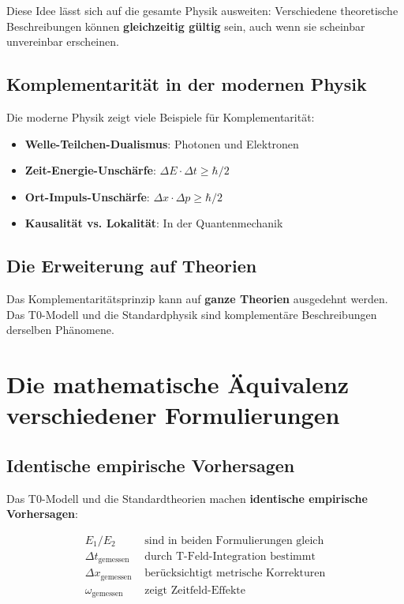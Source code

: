 \documentclass[12pt,a4paper]{report}
\begin{document}
	Diese Idee lässt sich auf die gesamte Physik ausweiten: Verschiedene theoretische Beschreibungen können \textbf{gleichzeitig gültig} sein, auch wenn sie scheinbar unvereinbar erscheinen.
	
	\subsection{Komplementarität in der modernen Physik}
	
	Die moderne Physik zeigt viele Beispiele für Komplementarität:
	
	\begin{itemize}
		\item \textbf{Welle-Teilchen-Dualismus}: Photonen und Elektronen
		\item \textbf{Zeit-Energie-Unschärfe}: $\Delta E \cdot \Delta t \geq \hbar/2$
		\item \textbf{Ort-Impuls-Unschärfe}: $\Delta x \cdot \Delta p \geq \hbar/2$
		\item \textbf{Kausalität vs. Lokalität}: In der Quantenmechanik
	\end{itemize}
	
	\subsection{Die Erweiterung auf Theorien}
	
	Das Komplementaritätsprinzip kann auf \textbf{ganze Theorien} ausgedehnt werden. Das T0-Modell und die Standardphysik sind komplementäre Beschreibungen derselben Phänomene.
	
	\section{Die mathematische Äquivalenz verschiedener Formulierungen}
	
	\subsection{Identische empirische Vorhersagen}
	
	Das T0-Modell und die Standardtheorien machen \textbf{identische empirische Vorhersagen}:
	
	\begin{align}
		E_{1}/E_{2} &\text{ sind in beiden Formulierungen gleich} \\
		\Delta t_{\text{gemessen}} &\text{ durch T-Feld-Integration bestimmt} \\
		\Delta x_{\text{gemessen}} &\text{ berücksichtigt metrische Korrekturen} \\
		\omega_{\text{gemessen}} &\text{ zeigt Zeitfeld-Effekte}
	\end{align}
	
\end{document}
